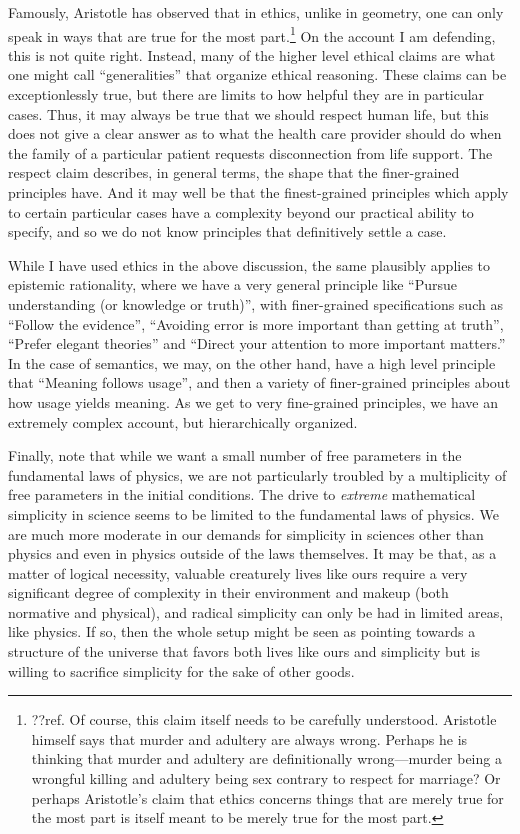 Famously, Aristotle has observed that in ethics, unlike in geometry, one can only speak in ways that are true for the most 
part.\footnote{??ref. Of course, this claim itself needs to be carefully understood. Aristotle himself says that murder and 
adultery are always wrong. Perhaps he is thinking that murder and adultery are definitionally wrong---murder being a wrongful 
killing and adultery being sex contrary to respect for marriage? Or perhaps Aristotle's claim that ethics concerns
things that are merely true for the most part is itself meant to be merely true for the most part.} On the account I am defending, this is not quite right. Instead,
many of the higher level ethical claims are what one might call ``generalities'' that organize ethical reasoning. These claims 
can be exceptionlessly true, but there are limits to how helpful they are in particular cases. Thus, it may always be true that we 
should respect human life, but this does not give a clear answer as to what the health care provider should do when the family of 
a particular patient requests disconnection from life support. The respect claim describes, in general terms, the shape that the 
finer-grained principles have. And it may well be that the finest-grained principles which apply to certain particular cases
have a complexity beyond our practical ability to specify, and so we do not know principles that definitively settle a case.

While I have used ethics in the above discussion, the same plausibly applies to epistemic rationality, where we have a very general
principle like ``Pursue understanding (or knowledge or truth)'', with finer-grained specifications such as ``Follow the evidence'',
``Avoiding error is more important than getting at truth'', ``Prefer elegant theories'' and ``Direct your attention to more important matters.'' 
In the case
of semantics, we may, on the other hand, have a high level principle that ``Meaning follows usage'', and then a variety of finer-grained 
principles about how usage yields meaning. As we get to very fine-grained principles, we have an extremely complex account, but hierarchically
organized.

Finally, note that while we want a small number of free parameters in the fundamental laws of physics, we are not
particularly troubled by a multiplicity of free parameters in the initial conditions. The drive to \textit{extreme}
mathematical simplicity in science seems to be limited to the fundamental laws of physics. We are much more
moderate in our demands for simplicity in sciences other than physics and even in physics outside of the laws
themselves. It may be that, as a matter of logical necessity, valuable creaturely lives like ours require a
very significant degree of complexity in their environment and makeup (both normative and physical), and radical
simplicity can only be had in limited areas, like physics. If so, then the whole setup might be seen as pointing 
towards a structure of the universe that favors both lives like ours and simplicity but is willing to sacrifice 
simplicity for the sake of other goods.

